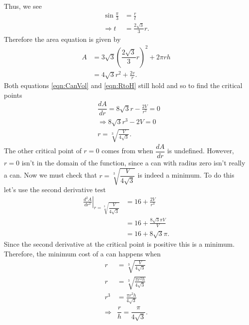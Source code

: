 \documentclass{hwset}
\begin{document}
\begin{enumerate}
\begin{solution}
\begin{center}
    \end{center}
    Thus, we see
    \begin{align*}
      \sin \frac{\pi}{3} &= \frac{r}{t} \\
      \Rightarrow t &= \frac{2\sqrt{3}}{3} r.
    \end{align*}
    Therefore the area equation is given by
    \begin{align*}
      A &= 3\sqrt{3}\left( \dfrac{2\sqrt{3}}{3} r \right)^2 + 2\pi r h \\
      &= 4\sqrt{3} r^2 + \frac{2v}{r} .
    \end{align*}
    Both equations \eqref{eqn:CanVol} and \eqref{eqn:RtoH} still hold and so to
    find the critical points
    \begin{align*}
      & \dfrac{dA}{dr} = 8\sqrt{3} r - \frac{2V}{r^2} = 0 \\
      & \Rightarrow 8\sqrt{3} r^3 - 2V = 0 \\
      & r = \sqrt[3]{\frac{V}{4\sqrt{3}}}.
    \end{align*}
    The other critical point of $r=0$ comes from when $\dfrac{dA}{dr}$ is
    undefined. However, $r=0$ isn't in the domain of the function, since a can
    with radius zero isn't really a can. Now we must check that
    $r=\sqrt[3]{\dfrac{V}{4\sqrt{3}}}$ is indeed a minimum. To do this let's use the
    second derivative test
    \begin{align*}
      \left.\frac{d^2A}{dr^2}\right|_{r=\sqrt[3]{\dfrac{V}{4\sqrt{3}}}} &= 16 + \frac{2V}{r^3} \\
      &= 16 + \frac{8\sqrt{3}\pi V}{V} \\
      &= 16 + 8\sqrt{3}\pi.
    \end{align*}
    Since the second derivative at the critical point is positive this is a
    minimum. Therefore, the minimum cost of a can happens when
    \begin{align*}
      r &= \sqrt[3]{\frac{V}{4\sqrt{3}}} \\
      r &= \sqrt[3]{\frac{\pi r^2 h}{4\sqrt{3}}} \\
      r^3 &= \frac{\pi r^2 h}{4\sqrt{3}} \\
      \Rightarrow &\boxed{\dfrac{r}{h}=\dfrac{\pi}{4\sqrt{3}}}.
    \end{align*}
  \end{solution}
\end{enumerate}
\end{document}
